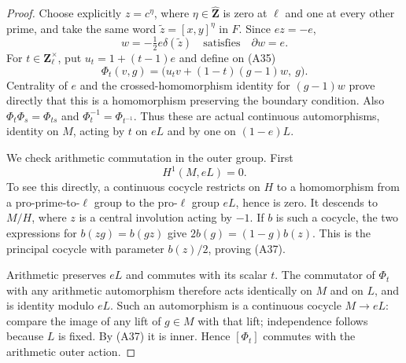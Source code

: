 \begin{proof}
Choose explicitly $z=c^{\eta}$, where
$\eta\in\widehat{\mathbf Z}$ is zero at $\ell$
and one at every other prime, and take the same
word $\widetilde z=[x,y]^\eta$ in $F$. Since $ez=-e$,
\[
                    w=-\tfrac12e\delta(\widetilde z)
          \quad\text{satisfies}\quad \partial w=e.
\]
For $t\in\mathbf Z_\ell^\times$, put
$u_t=1+(t-1)e$ and define on (A35)
\[
 \Phi_t(v,g)=
 \bigl(u_tv+(1-t)(g-1)w,\ g\bigr).                         \tag{A36}
\]
Centrality of $e$ and the crossed-homomorphism identity
for $(g-1)w$ prove directly that this is a homomorphism
preserving the boundary condition. Also
$\Phi_t\Phi_s=\Phi_{ts}$ and
$\Phi_t^{-1}=\Phi_{t^{-1}}$. Thus these are actual
continuous automorphisms, identity on $M$, acting by
$t$ on $eL$ and by one on $(1-e)L$.

We check arithmetic commutation in the outer group.
First
\[
                         H^1(M,eL)=0.                       \tag{A37}
\]
To see this directly, a continuous cocycle restricts
on $H$ to a homomorphism from a pro-prime-to-$\ell$
group to the pro-$\ell$ group $eL$, hence is zero.
It descends to $M/H$, where $z$ is a central
involution acting by $-1$. If $b$ is such a cocycle,
the two expressions for $b(zg)=b(gz)$ give
$2b(g)=(1-g)b(z)$. This is the principal cocycle
with parameter $b(z)/2$, proving (A37).

Arithmetic preserves $eL$ and commutes with its scalar
$t$. The commutator of $\Phi_t$ with any arithmetic
automorphism therefore acts identically on $M$ and
on $L$, and is identity modulo $eL$. Such an
automorphism is a continuous cocycle $M\to eL$:
compare the image of any lift of $g\in M$ with that
lift; independence follows because $L$ is fixed.
By (A37) it is inner. Hence $[\Phi_t]$ commutes
with the arithmetic outer action.


\end{proof}
